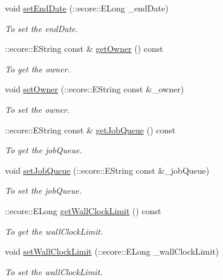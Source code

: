 \begin{DoxyCompactItemize}
void \hyperlink{classTMS__Data_1_1Job_a694601a721897c30b8416b34a39603b1}{setEndDate} (::ecore::ELong \_\-endDate)
\begin{DoxyCompactList}\small\item\em To set the endDate. \item\end{DoxyCompactList}\item 
::ecore::EString const \& \hyperlink{classTMS__Data_1_1Job_a20b02fa29483093584d79e074d38d61e}{getOwner} () const 
\begin{DoxyCompactList}\small\item\em To get the owner. \item\end{DoxyCompactList}\item 
void \hyperlink{classTMS__Data_1_1Job_a550fb9f051c83df48d61157e0b89ce50}{setOwner} (::ecore::EString const \&\_\-owner)
\begin{DoxyCompactList}\small\item\em To set the owner. \item\end{DoxyCompactList}\item 
::ecore::EString const \& \hyperlink{classTMS__Data_1_1Job_aaaafa266c3a4e95cd84e2011046a5c2f}{getJobQueue} () const 
\begin{DoxyCompactList}\small\item\em To get the jobQueue. \item\end{DoxyCompactList}\item 
void \hyperlink{classTMS__Data_1_1Job_a08be3b913010e3f97c35f695728015e4}{setJobQueue} (::ecore::EString const \&\_\-jobQueue)
\begin{DoxyCompactList}\small\item\em To set the jobQueue. \item\end{DoxyCompactList}\item 
::ecore::ELong \hyperlink{classTMS__Data_1_1Job_a879b11ee9a24a4568101131b9ef5aa7b}{getWallClockLimit} () const 
\begin{DoxyCompactList}\small\item\em To get the wallClockLimit. \item\end{DoxyCompactList}\item 
void \hyperlink{classTMS__Data_1_1Job_a35daa32dfb0e1c663fedf227aa7c3166}{setWallClockLimit} (::ecore::ELong \_\-wallClockLimit)
\begin{DoxyCompactList}\small\item\em To set the wallClockLimit. \item\end{DoxyCompactList}\item 

\end{DoxyCompactItemize}
